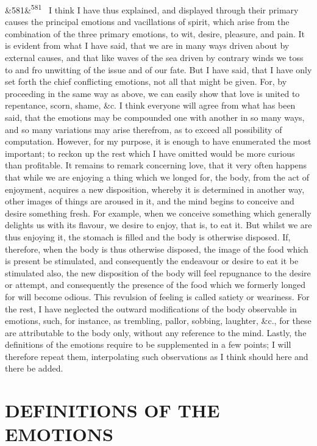 \documentclass[12pt]{article}
\newcommand{\para}[1][]{\par\noindent\ifx&#1&\else\textsuperscript{\footnotesize #1}~\fi}
\begin{document}
\para[581] I think I have thus explained, and displayed through their primary causes the principal emotions and vacillations of spirit, which arise from the combination of the three primary emotions, to wit, desire, pleasure, and pain. It is evident from what I have said, that we are in many ways driven about by external causes, and that like waves of the sea driven by contrary winds we toss to and fro unwitting of the issue and of our fate. But I have said, that I have only set forth the chief conflicting emotions, not all that might be given. For, by proceeding in the same way as above, we can easily show that love is united to repentance, scorn, shame, \&c. I think everyone will agree from what has been said, that the emotions may be compounded one with another in so many ways, and so many variations may arise therefrom, as to exceed all possibility of computation. However, for my purpose, it is enough to have enumerated the most important; to reckon up the rest which I have omitted would be more curious than profitable. It remains to remark concerning love, that it very often happens that while we are enjoying a thing which we longed for, the body, from the act of enjoyment, acquires a new disposition, whereby it is determined in another way, other images of things are aroused in it, and the mind begins to conceive and desire something fresh. For example, when we conceive something which generally delights us with its flavour, we desire to enjoy, that is, to eat it. But whilst we are thus enjoying it, the stomach is filled and the body is otherwise disposed. If, therefore, when the body is thus otherwise disposed, the image of the food which is present be stimulated, and consequently the endeavour or desire to eat it be stimulated also, the new disposition of the body will feel repugnance to the desire or attempt, and consequently the presence of the food which we formerly longed for will become odious. This revulsion of feeling is called satiety or weariness. For the rest, I have neglected the outward modifications of the body observable in emotions, such, for instance, as trembling, pallor, sobbing, laughter, \&c., for these are attributable to the body only, without any reference to the mind. Lastly, the definitions of the emotions require to be supplemented in a few points; I will therefore repeat them, interpolating such observations as I think should here and there be added.

\section*{DEFINITIONS OF THE EMOTIONS}
\end{document}
